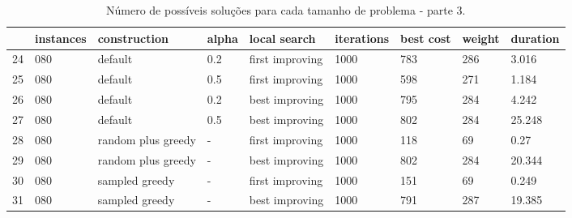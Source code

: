 \begin{landscape}
    \begin{table}
    \centering
    \begin{tabular}{lllllllll}
    \toprule
    {} & instances &        construction & alpha &     local search & iterations & best cost & weight & duration \\
    \midrule
    24 &       080 &             default &   0.2 &  first improving &       1000 &       783 &    286 &    3.016 \\
    25 &       080 &             default &   0.5 &  first improving &       1000 &       598 &    271 &    1.184 \\
    26 &       080 &             default &   0.2 &   best improving &       1000 &       795 &    284 &    4.242 \\
    27 &       080 &             default &   0.5 &   best improving &       1000 &       802 &    284 &   25.248 \\
    28 &       080 &  random plus greedy &     - &  first improving &       1000 &       118 &     69 &     0.27 \\
    29 &       080 &  random plus greedy &     - &   best improving &       1000 &       802 &    284 &   20.344 \\
    30 &       080 &      sampled greedy &     - &  first improving &       1000 &       151 &     69 &    0.249 \\
    31 &       080 &      sampled greedy &     - &   best improving &       1000 &       791 &    287 &   19.385 \\
    \bottomrule
    \end{tabular}
    \caption{Número de possíveis soluções para cada tamanho de problema - parte 3.}
    \label{table:all-data-3}
    \end{table}


\end{landscape}
